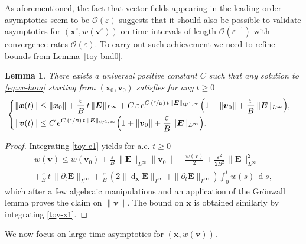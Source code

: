 \documentclass[10pt]{amsart}
\let\mathcal\mathscr
\newenvironment{splitcases}
{\begin{cases}\begin{aligned}}
{\end{aligned}\end{cases}}
\newcommand{\Psfrac}[2]{(\sfrac{#1}{#2})}
\let\eps\varepsilon
\let\d\partial
\DeclareMathOperator\dD{d}\let\dd\dD
\theoremstyle{plain}
\newtheorem{lemma}[theorem]{Lemma}
\theoremstyle{definition}
\newcommand{\bl}{\begin{lemma}}
\newcommand{\el}{\end{lemma}}
\newcommand\bE{{\boldsymbol E}}
\newcommand\bfv{{\boldsymbol v}}
\newcommand\bfx{{\boldsymbol x}}
\newcommand\cO{{\mathcal O}}
\let\e w
\begin{document}
As aforementioned, the fact that vector fields appearing in the leading-order asymptotics seem to be $\cO(\eps)$ suggests that it should also be possible to validate asymptotics for $(\bfx^\eps,\e(\bfv^\eps))$ on time intervals of length $\cO(\eps^{-1})$ with convergence rates $\cO(\eps)$. To carry out such achievement we need to refine bounds from Lemma~\ref{toy-bnd0}.

\bl
\label{toy-bnd-long}
There exists a universal positive constant $C$ such that any solution to \eqref{eq:xv-hom} starting from $(\bfx_0,\bfv_0)$ satisfies for any $t\geq0$
\[
\begin{splitcases}
\|\bfx(t)\|&\leq \|\bfx_0\|
+\frac{\eps}{B}\,t\,\|\bE\|_{L^\infty}
+C\,\eps\,e^{C\,\Psfrac{\eps}{B}\,t\,\|\bE\|_{\dot{W}^{1,\infty}}}
\Bigl(1+\|\bfv_0\|+\frac{\eps}{B}\,\|\bE\|_{L^\infty}\Bigr),
\\
\|\bfv(t)\|&\leq C\,e^{C\,\Psfrac{\eps}{B}\,t\,\|\bE\|_{\dot{W}^{1,\infty}}}
\Bigl(1+\|\bfv_0\|+\frac{\eps}{B}\,\|\bE\|_{L^\infty}\Bigr).
\end{splitcases}
\]
\el
\begin{proof}
Integrating \eqref{toy-e1} yields for a.e. $t\geq0$
\begin{multline*}
\e(\bfv)\leq \e(\bfv_0) +\frac{\eps}{B}\,\|\bE\|_{L^\infty}\|\bfv_0\|
+\frac{\e(\bfv)}{2}+\frac{\eps^2}{2B^2}\,\|\bE\|_{L^\infty}^2\\[-5pt]
+\frac{\eps}{B}\,t\,\|\d_t\bE\|_{L^\infty}
+\frac{\eps}{B}\,(2\|\dD_\bfx\bE\|_{L^\infty}+\|\d_t\bE\|_{L^\infty})\int_0^t
\e(s)\,\dD s,
\end{multline*}
which after a few algebraic manipulations and an application of the Grönwall lemma proves the claim on $\|\bfv\|$. The bound on $\bfx$ is obtained similarly by integrating \eqref{toy-x1}.
\end{proof}

We now focus on large-time asymptotics for $(\bfx,\e(\bfv))$.
\end{document}
